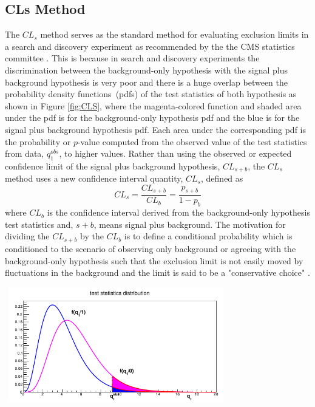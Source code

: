 \subsection{CLs Method}
The $CL_{s}$ method serves as the standard method for evaluating exclusion limits in a search and discovery experiment as recommended by the the CMS statistics committee \cite{CLS}. This is because in search  and discovery experiments the discrimination between the background-only hypothesis with the signal plus background hypothesis is very poor and there is a huge overlap between the probability density functions~(pdfs) of the test statistics of both hypothesis as shown in Figure \ref{fig:CLS}, where the magenta-colored function and shaded area under the pdf is for the background-only hypothesis pdf and the blue is for the signal plus background hypothesis pdf. Each area under the corresponding pdf is the probability or $p$-value computed from the observed value of the test statistics from data, $q^{obs}_{1}$,  to higher values. Rather than using the observed or expected confidence limit of the signal plus background hypothesis, $CL_{s+b}$, the $CL_{s}$ method uses a new confidence interval quantity, $CL_{s}$, defined as 
\begin{equation}
CL_{s}  =  \frac{CL_{s+b}}{CL_{b}}  = \frac{p_{s+b}}{1 - p_{b}}
\end{equation}
where $CL_{b}$ is the confidence interval derived from the background-only hypothesis test statistics and, $s+b$, means signal plus background. The motivation for dividing the  $CL_{s+b}$ by the $CL_{b}$ is to define a conditional probability which is conditioned to the scenario of observing only background or agreeing with the background-only hypothesis such that the exclusion limit is not easily moved by fluctuations in the background and the limit is said to be a "conservative choice" \cite{LIM}. 

\vspace{5mm}
\begin{minipage}{0.90\linewidth} 
\begin{center}
\mbox{
\includegraphics[height=0.55\textwidth, width=0.7\textwidth]{THESISPLOTS/CLS_METHOD.png}}
\label{fig:CLS}
\end{center}
\end{minipage}

